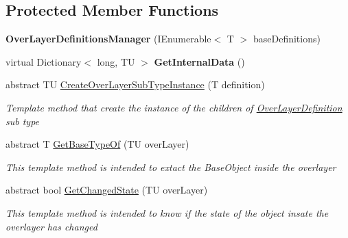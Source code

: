 \subsection*{Protected Member Functions}
\begin{DoxyCompactItemize}
\item 
\hypertarget{class_s_e_mod_a_p_i_1_1_a_p_i_1_1_definitions_1_1_over_layer_definitions_manager_a9af5b5559d1bb5d68b2c7859621088d8}{}{\bfseries Over\+Layer\+Definitions\+Manager} (I\+Enumerable$<$ T $>$ base\+Definitions)\label{class_s_e_mod_a_p_i_1_1_a_p_i_1_1_definitions_1_1_over_layer_definitions_manager_a9af5b5559d1bb5d68b2c7859621088d8}

\item 
\hypertarget{class_s_e_mod_a_p_i_1_1_a_p_i_1_1_definitions_1_1_over_layer_definitions_manager_a0d0e8eef9ef6e1fd62635202862ce96c}{}virtual Dictionary$<$ long, T\+U $>$ {\bfseries Get\+Internal\+Data} ()\label{class_s_e_mod_a_p_i_1_1_a_p_i_1_1_definitions_1_1_over_layer_definitions_manager_a0d0e8eef9ef6e1fd62635202862ce96c}

\item 
abstract T\+U \hyperlink{class_s_e_mod_a_p_i_1_1_a_p_i_1_1_definitions_1_1_over_layer_definitions_manager_a67dfec6504b8d878d75c448b92bdf18b}{Create\+Over\+Layer\+Sub\+Type\+Instance} (T definition)
\begin{DoxyCompactList}\small\item\em Template method that create the instance of the children of \hyperlink{class_s_e_mod_a_p_i_1_1_a_p_i_1_1_definitions_1_1_over_layer_definition}{Over\+Layer\+Definition} sub type \end{DoxyCompactList}\item 
abstract T \hyperlink{class_s_e_mod_a_p_i_1_1_a_p_i_1_1_definitions_1_1_over_layer_definitions_manager_a05521fea3767c7447944646a8494cf31}{Get\+Base\+Type\+Of} (T\+U over\+Layer)
\begin{DoxyCompactList}\small\item\em This template method is intended to extact the Base\+Object inside the overlayer \end{DoxyCompactList}\item 
abstract bool \hyperlink{class_s_e_mod_a_p_i_1_1_a_p_i_1_1_definitions_1_1_over_layer_definitions_manager_a1b49a033df3a694aa31f816b9b9f622e}{Get\+Changed\+State} (T\+U over\+Layer)
\begin{DoxyCompactList}\small\item\em This template method is intended to know if the state of the object insate the overlayer has changed \end{DoxyCompactList}\end{DoxyCompactItemize}
